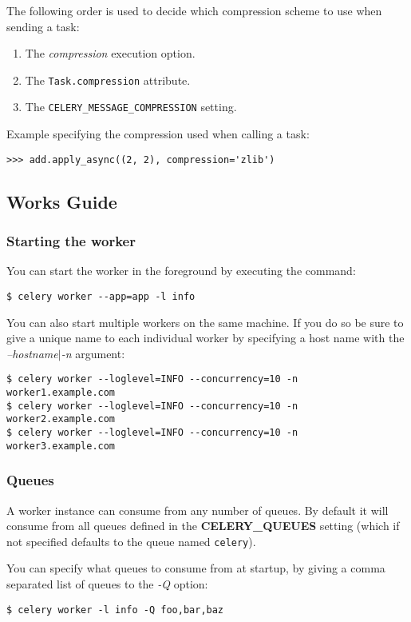 \documentclass[9pt,a4paper]{article}
\begin{document}
\begin{CJK*}{GBK}{kai}
The following order is used to decide which compression scheme to use when sending a task:

\begin{enumerate}
\item The \textit{compression} execution option.
\item The \verb"Task.compression" attribute.
\item The \verb"CELERY_MESSAGE_COMPRESSION" setting.
\end{enumerate}

Example specifying the compression used when calling a task:

\begin{Verbatim}[frame=single]
>>> add.apply_async((2, 2), compression='zlib')
\end{Verbatim}

\subsection{Works Guide}

\subsubsection{Starting the worker}
You can start the worker in the foreground by executing the command:
\begin{Verbatim}[frame=single]
$ celery worker --app=app -l info
\end{Verbatim}

You can also start multiple workers on the same machine. If you do so be sure to give a unique name to each individual worker by specifying a host name with the \textit{--hostname$|$-n} argument:
\begin{Verbatim}[frame=single]
$ celery worker --loglevel=INFO --concurrency=10 -n worker1.example.com
$ celery worker --loglevel=INFO --concurrency=10 -n worker2.example.com
$ celery worker --loglevel=INFO --concurrency=10 -n worker3.example.com
\end{Verbatim}

\subsubsection{Queues}
A worker instance can consume from any number of queues. By default it will consume from all queues defined in the \textbf{CELERY\_QUEUES} setting (which if not specified defaults to the queue named \verb"celery").

You can specify what queues to consume from at startup, by giving a comma separated list of queues to the \textit{-Q} option:
\begin{Verbatim}[frame=single]
$ celery worker -l info -Q foo,bar,baz
\end{Verbatim}


\end{CJK*}
\end{document}
